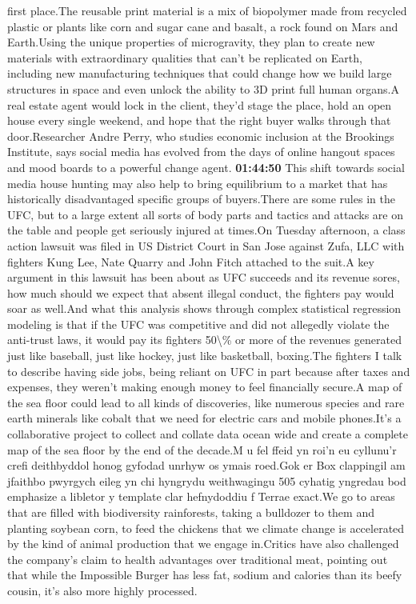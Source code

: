 \documentclass{article}%
\begin{document}
first place.The reusable print material is a mix of biopolymer made from recycled plastic or plants like corn and sugar cane and basalt, a rock found on Mars and Earth.Using the unique properties of microgravity, they plan to create new materials with extraordinary qualities that can't be replicated on Earth, including new manufacturing techniques that could change how we build large structures in space and even unlock the ability to 3D print full human organs.A real estate agent would lock in the client, they'd stage the place, hold an open house every single weekend, and hope that the right buyer walks through that door.Researcher Andre Perry, who studies economic inclusion at the Brookings Institute, says social media has evolved from the days of online hangout spaces and mood boards to a powerful change agent.%
\textbf{01:44:50}%
\newline%
This shift towards social media house hunting may also help to bring equilibrium to a market that has historically disadvantaged specific groups of buyers.There are some rules in the UFC, but to a large extent all sorts of body parts and tactics and attacks are on the table and people get seriously injured at times.On Tuesday afternoon, a class action lawsuit was filed in US District Court in San Jose against Zufa, LLC with fighters Kung Lee, Nate Quarry and John Fitch attached to the suit.A key argument in this lawsuit has been about as UFC succeeds and its revenue sores, how much should we expect that absent illegal conduct, the fighters pay would soar as well.And what this analysis shows through complex statistical regression modeling is that if the UFC was competitive and did not allegedly violate the anti{-}trust laws, it would pay its fighters 50\textbackslash{}\% or more of the revenues generated just like baseball, just like hockey, just like basketball, boxing.The fighters I talk to describe having side jobs, being reliant on UFC in part because after taxes and expenses, they weren't making enough money to feel financially secure.A map of the sea floor could lead to all kinds of discoveries, like numerous species and rare earth minerals like cobalt that we need for electric cars and mobile phones.It's a collaborative project to collect and collate data ocean wide and create a complete map of the sea floor by the end of the decade.M u fel ffeid yn roi'n eu cyllunu'r crefi deithbyddol honog gyfodad unrhyw os ymais roed.Gok er Box clappingil am jfaithbo pwyrgych eileg yn chi hyngrydu weithwagingu 505 cyhatig yngredau bod emphasize a libletor y template clar hefnydoddiu f Terrae exact.We go to areas that are filled with biodiversity rainforests, taking a bulldozer to them and planting soybean corn, to feed the chickens that we climate change is accelerated by the kind of animal production that we engage in.Critics have also challenged the company's claim to health advantages over traditional meat, pointing out that while the Impossible Burger has less fat, sodium and calories than its beefy cousin, it's also more highly processed.%
\end{document}
